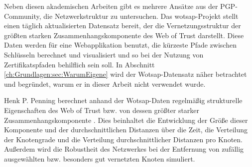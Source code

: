 Neben diesen akademischen Arbeiten gibt es mehrere Ansätze aus der
PGP-Community, die Netzwerkstruktur zu untersuchen. Das
wotsap-Projekt \cite{Cederlof} stellt einen täglich aktualisierten
Datensatz bereit, der die Vernetzungsstruktur der größten starken
Zusammenhangskomponente des Web of Trust darstellt. Diese Daten werden
für eine Webapplikation benutzt, die kürzeste Pfade
zwischen Schlüsseln berechnet und visualisiert und so bei der
Nutzung von Zertifikatspfaden behilflich sein soll. In Abschnitt
\ref{ch:Grundlagen:sec:WarumEigene} wird der Wotsap-Datensatz näher
betrachtet und begründet, warum er in dieser Arbeit nicht verwendet
wurde. 

Henk P. Penning berechnet anhand der Wotsap-Daten regelmäßig
strukturelle Eigenschaften des Web of Trust bzw. von dessen größter
starker Zusammenhangskomponente \cite{Penning}. Dies beinhaltet die
Entwicklung der Größe dieser Komponente und der durchschnittlichen
Distanzen über die Zeit, die Verteilung der Knotengrade und die
Verteilung durchschnittlicher Distanzen pro Knoten. Außerdem wird die
Robustheit des Netzwerkes bei der Entfernung von zufällig
ausgewählten bzw. besonders gut vernetzten Knoten simuliert.

